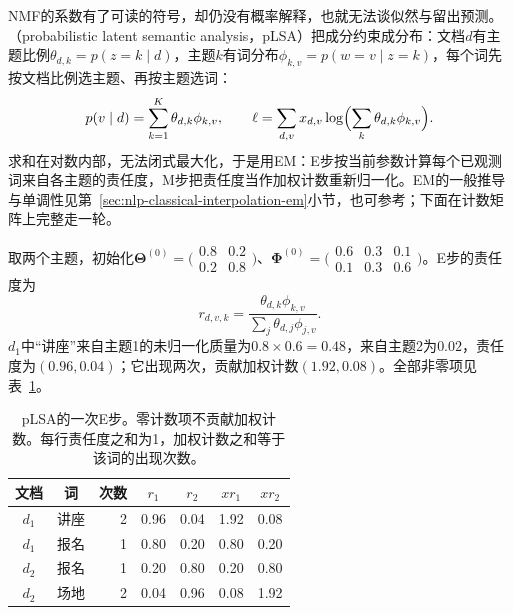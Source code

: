 NMF的系数有了可读的符号，却仍没有概率解释，也就无法谈似然与留出预测。（probabilistic latent semantic analysis，pLSA）把成分约束成分布：文档$d$有主题比例$\theta_{d,k}=p(z=k\mid d)$，主题$k$有词分布$\phi_{k,v}=p(w=v\mid z=k)$，每个词先按文档比例选主题、再按主题选词\cite{pgm-static-directed-hofmann1999}：
\[
 p(v\mid d)=\sum_{k=1}^{K}\theta_{d,k}\phi_{k,v},\qquad
 \ell=\sum_{d,v}x_{d,v}\log\Bigl(\sum_k\theta_{d,k}\phi_{k,v}\Bigr).
\]
求和在对数内部，无法闭式最大化，于是用EM：E步按当前参数计算每个已观测词来自各主题的责任度，M步把责任度当作加权计数重新归一化。EM的一般推导与单调性见第~\ref{sec:nlp-classical-interpolation-em}小节，也可参考；下面在计数矩阵上完整走一轮。

取两个主题，初始化$\bm\Theta^{(0)}=\bigl(\begin{smallmatrix}0.8&0.2\\0.2&0.8\end{smallmatrix}\bigr)$、$\bm\Phi^{(0)}=\bigl(\begin{smallmatrix}0.6&0.3&0.1\\0.1&0.3&0.6\end{smallmatrix}\bigr)$。E步的责任度为
\[
 r_{d,v,k}=\frac{\theta_{d,k}\phi_{k,v}}{\sum_j\theta_{d,j}\phi_{j,v}}.
\]
$d_1$中“讲座”来自主题1的未归一化质量为$0.8\times0.6=0.48$，来自主题2为$0.02$，责任度为$(0.96,0.04)$；它出现两次，贡献加权计数$(1.92,0.08)$。全部非零项见表~\ref{tab:nlp-classification-plsa-em}。

\begin{table}[htbp]
 \centering
 \begin{tabular}{@{}ccrcccc@{}}
  \toprule
  文档 & 词 & 次数 & $r_1$ & $r_2$ & $x r_1$ & $x r_2$\\
  \midrule
  $d_1$ & 讲座 & 2 & 0.96 & 0.04 & 1.92 & 0.08\\
  $d_1$ & 报名 & 1 & 0.80 & 0.20 & 0.80 & 0.20\\
  $d_2$ & 报名 & 1 & 0.20 & 0.80 & 0.20 & 0.80\\
  $d_2$ & 场地 & 2 & 0.04 & 0.96 & 0.08 & 1.92\\
  \bottomrule
 \end{tabular}
 \caption{pLSA的一次E步。零计数项不贡献加权计数。每行责任度之和为1，加权计数之和等于该词的出现次数。}
 \label{tab:nlp-classification-plsa-em}
\end{table}


